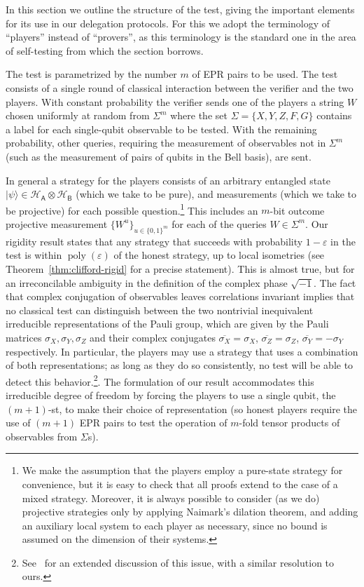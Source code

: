 \documentclass[11pt]{article}
\newcommand{\ket}[1]{|#1\rangle}
\DeclareMathOperator{\poly}{poly}
\newcommand{\reg}[1]{{\textsf{#1}}}
\newcommand{\mH}{\mathcal{H}}
\newcommand{\eps}{\varepsilon}
\begin{document}
In this section we outline the structure of the test, giving the important elements for its use in our delegation protocols. For this we adopt the terminology of ``players'' instead of ``provers'', as this terminology is the standard one in the area of self-testing from which the section borrows.   

The test is parametrized by the number $m$ of EPR pairs to be used. The test  consists of a single round of classical interaction between the verifier and the two players. With constant probability the verifier sends one of the players a string $W$ chosen uniformly at random from $\Sigma^m$ where the set $\Sigma = \{X,Y,Z,F,G\}$ contains a label for each single-qubit observable to be tested. With the remaining probability, other queries, requiring the measurement of observables not in $\Sigma^m$ (such as the measurement of pairs of qubits in the Bell basis), are sent. 

In general a strategy for the players consists of an arbitrary entangled state $\ket{\psi} \in \mH_\reg{A} \otimes \mH_\reg{B}$ (which we take to be pure), and measurements (which we take to be projective) for each possible question.\footnote{We make the assumption that the players employ a pure-state strategy for convenience, but it is easy to check that all proofs extend to the case of a mixed strategy. Moreover, it is always possible to consider (as we do)  projective strategies only by applying Naimark's dilation theorem, and adding an auxiliary local system to each player as necessary, since no bound is assumed on the dimension of their systems.} This includes an $m$-bit outcome projective measurement $\{W^u\}_{u\in\{0,1\}^{m}}$ for each of the queries $W\in\Sigma^m$. Our rigidity result states that any strategy that succeeds with probability $1-\eps$ in the test is within $\poly(\eps)$ of the honest strategy, up to local isometries (see Theorem~\ref{thm:clifford-rigid} for a precise statement). This is almost true, but for an irreconcilable ambiguity in the definition of the complex phase $\sqrt{-1}$. The fact that complex conjugation of observables 
leaves correlations invariant implies that no classical test can distinguish between the two nontrivial inequivalent irreducible representations of the Pauli group, which are given by the Pauli matrices $\sigma_X,\sigma_Y,\sigma_Z$ and their complex conjugates $\overline{\sigma_X}=\sigma_X$, $\overline{\sigma_Z}=\sigma_Z$, $\overline{\sigma_Y}=-\sigma_Y$ respectively. In particular, the players may use a strategy that uses a combination of both representations; as long as they do so consistently, no test will be able to detect this behavior.\footnote{See~\cite[Appendix A]{reichardt2012classicalarxiv} for an extended discussion of this issue, with a similar resolution to ours.}.  The formulation of our result accommodates this irreducible degree of freedom by forcing the players to use a single qubit, the $(m+1)$-st, to make their choice of representation (so honest players require the use of $(m+1)$ EPR pairs to test the operation of $m$-fold tensor products of observables from $\Sigma$s). 
\end{document}
